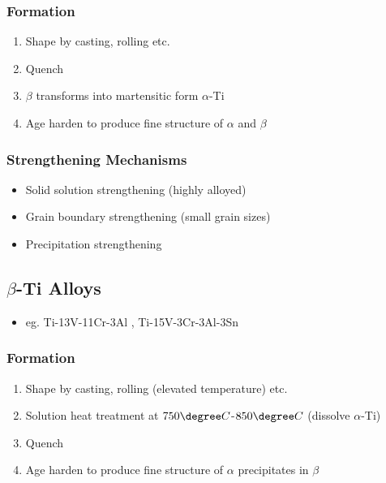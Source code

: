 \subsubsection{Formation} %
\label{ssub:}

\begin{enumerate}
  \item Shape by casting, rolling etc.
  \item Quench
  \item $\beta$ transforms into martensitic form $\alpha$-Ti
  \item Age harden to produce fine structure of $\alpha$ and $\beta$
\end{enumerate}

\subsubsection{Strengthening Mechanisms} %
\label{ssub:strengthening_mechanisms}
\begin{itemize}
  \item Solid solution strengthening (highly alloyed)
  \item Grain boundary strengthening (small grain sizes)
  \item Precipitation strengthening
\end{itemize}


\subsection{$\beta$-Ti Alloys} %
\label{sub:}
\begin{itemize}
  \item eg. Ti-13V-11Cr-3Al , Ti-15V-3Cr-3Al-3Sn\end{itemize}

\subsubsection{Formation} %
\label{ssub:}

\begin{enumerate}
  \item Shape by casting, rolling (elevated temperature) etc.
  \item Solution heat treatment at $750\degree C$-$850 \degree C$ (dissolve $\alpha$-Ti)
  \item Quench
  \item Age harden to produce fine structure of $\alpha$ precipitates in $\beta$
\end{enumerate}

